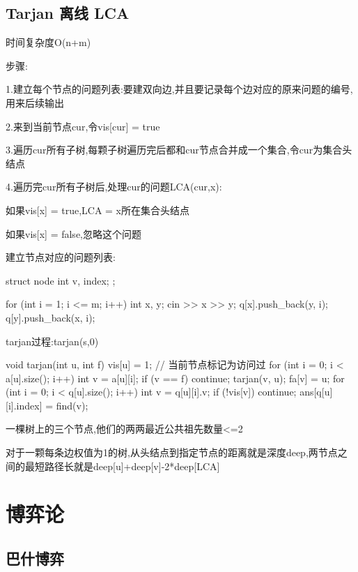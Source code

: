 \documentclass[UTF8,a4paper,11pt]{ctexart}
\newcommand{\topic}[1]{%
  \par\needspace{3\baselineskip}\vspace{0.45em}%
  \noindent{\bfseries\color{Primary}#1}\par\vspace{0.12em}%
}
\begin{document}
\subsection{Tarjan 离线 LCA}

时间复杂度O(n+m)

步骤:

1.建立每个节点的问题列表:要建双向边,并且要记录每个边对应的原来问题的编号,用来后续输出

2.来到当前节点cur,令vis[cur] = true

3.遍历cur所有子树,每颗子树遍历完后都和cur节点合并成一个集合,令cur为集合头结点

4.遍历完cur所有子树后,处理cur的问题LCA(cur,x):

如果vis[x] = true,LCA = x所在集合头结点

如果vis[x] = false,忽略这个问题

建立节点对应的问题列表:

\begin{CodeBlock}
struct node {
    int v, index;
};
\end{CodeBlock}

\begin{CodeBlock}
for (int i = 1; i <= m; i++) {
    int x, y;
    cin >> x >> y;
    q[x].push_back({y, i});
    q[y].push_back({x, i});
}
\end{CodeBlock}

tarjan过程:tarjan(s,0)

\begin{CodeBlock}
void tarjan(int u, int f) {
    vis[u] = 1; // 当前节点标记为访问过
    for (int i = 0; i < a[u].size(); i++) {
        int v = a[u][i];
        if (v == f)
            continue;
        tarjan(v, u);
        fa[v] = u;
    }
    for (int i = 0; i < q[u].size(); i++) {
        int v = q[u][i].v;
        if (!vis[v])
            continue;
        ans[q[u][i].index] = find(v);
    }
}
\end{CodeBlock}

\topic{常用结论}

一棵树上的三个节点,他们的两两最近公共祖先数量<=2

对于一颗每条边权值为1的树,从头结点到指定节点的距离就是深度deep,两节点之间的最短路径长就是deep[u]+deep[v]-2*deep[LCA]

\section{博弈论}

\subsection{巴什博弈}
\end{document}
